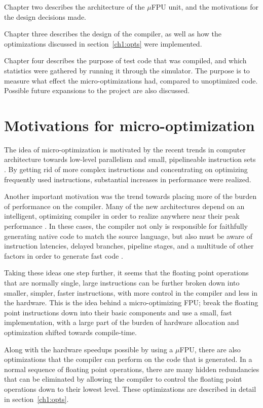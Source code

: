Chapter two describes the architecture of the $\mu$FPU unit, and the
motivations for the design decisions made.

Chapter three describes the design of the compiler, as well as how the
optimizations discussed in section~\ref{ch1:opts} were implemented.

Chapter four describes the purpose of test code that was compiled, and which
statistics were gathered by running it through the simulator.  The purpose
is to measure what effect the micro-optimizations had, compared to
unoptimized code.  Possible future expansions to the project are also
discussed.

\section{Motivations for micro-optimization}

The idea of micro-optimization is motivated by the recent trends in computer
architecture towards low-level parallelism and small, pipelineable
instruction sets \cite{patterson:risc,rad83}.  By getting rid of more
complex instructions and concentrating on optimizing frequently used
instructions, substantial increases in performance were realized.

Another important motivation was the trend towards placing more of the
burden of performance on the compiler.  Many of the new architectures depend
on an intelligent, optimizing compiler in order to realize anywhere near
their peak performance
\cite{ellis:bulldog,pet87,coutant:precision-compilers}.  In these cases, the
compiler not only is responsible for faithfully generating native code to
match the source language, but also must be aware of instruction latencies,
delayed branches, pipeline stages, and a multitude of other factors in order
to generate fast code \cite{gib86}.

Taking these ideas one step further, it seems that the floating point
operations that are normally single, large instructions can be further broken
down into smaller, simpler, faster instructions, with more control in the
compiler and less in the hardware.  This is the idea behind a
micro-optimizing FPU; break the floating point instructions down into their
basic components and use a small, fast implementation, with a large part of
the burden of hardware allocation and optimization shifted towards
compile-time.

Along with the hardware speedups possible by using a $\mu$FPU, there are
also optimizations that the compiler can perform on the code that is
generated.  In a normal sequence of floating point operations, there are
many hidden redundancies that can be eliminated by allowing the compiler to
control the floating point operations down to their lowest level.  These
optimizations are described in detail in section~\ref{ch1:opts}.

